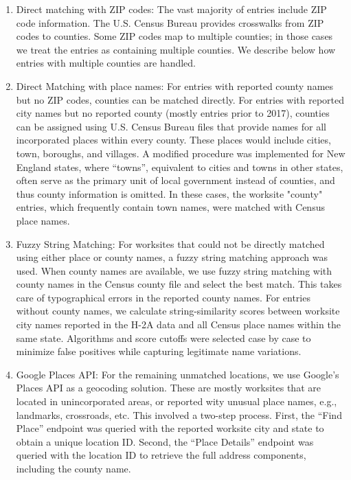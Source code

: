 \documentclass[14pt]{article}
\begin{document}
\begin{enumerate}
	\item Direct matching with ZIP codes:
	      The vast majority of entries include ZIP code information.
	      The U.S. Census Bureau provides crosswalks from ZIP codes to counties.
	      Some ZIP codes map to multiple counties; in those cases we treat the entries as containing multiple counties.
	      We describe below how entries with multiple counties are handled.
	\item Direct Matching with place names:
	      For entries with reported county names but no ZIP codes, counties can be matched directly.
	      For entries with reported city names but no reported county (mostly entries prior to 2017), counties can be assigned using U.S. Census Bureau files that provide names for all incorporated places within every county.
	      These places would include cities, town, boroughs, and villages.
	      A modified procedure was implemented for New England states, where ``towns'', equivalent to cities and towns in other states, often serve as the primary unit of local government instead of counties, and thus county information is omitted.
	      In these cases, the worksite "county" entries, which frequently contain town names, were matched with Census place names.
	\item Fuzzy String Matching: For worksites that could not be directly matched using either place or county names, a fuzzy string matching approach was used.
	      When county names are available, we use fuzzy string matching with county names in the Census county file and select the best match.
	      This takes care of typographical errors in the reported county names.
	      For entries without county names, we calculate string-similarity scores between worksite city names reported in the H-2A data and all Census place names within the same state.
	      Algorithms and score cutoffs were selected case by case to minimize false positives while capturing legitimate name variations.
	\item Google Places API: For the remaining unmatched locations, we use Google's Places API as a geocoding solution.
	      These are mostly worksites that are located in unincorporated areas, or reported wity unusual place names, e.g., landmarks, crossroads, etc.
	      This involved a two-step process.
	      First, the ``Find Place'' endpoint was queried with the reported worksite city and state to obtain a unique location ID.
	      Second, the ``Place Details'' endpoint was queried with the location ID to retrieve the full address components, including the county name.
\end{enumerate}
\end{document}
